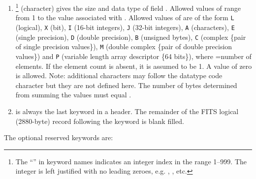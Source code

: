 \begin{enumerate}
\item {}\footnote{The ``'' in keyword names
indicates an integer index in the range 1--999.  The integer is left
justified with no leading zeroes, e.g. , ,
etc.} (character) gives the size and data type of field .
Allowed values of  range from 1 to the value associated 
with .  Allowed values of  are of the
form \verb|L| (logical), \verb|X| (bit), \verb|I|
(16-bit integers), \verb|J| (32-bit integers), \verb|A|
(characters), \verb|E| (single precision), \verb|D|
(double precision), \verb|B| (unsigned bytes), \verb|C|
(complex \{pair of single precision values\}), \verb|M| (double
complex \{pair of double precision values\}) and \verb|P|
(variable length array descriptor \{64 bits\}), where =number
of elements.  If the element count is absent, it is assumed to be 1.
A value of zero is allowed. Note: additional characters may follow the
datatype code character but they are not defined here.
The number of bytes determined from summing the 
values must equal .

\item {} is always the last keyword in a header.  The remainder
of the FITS logical (2880-byte) record following the 
keyword is blank filled.
\end{enumerate} %


The optional reserved keywords are:

